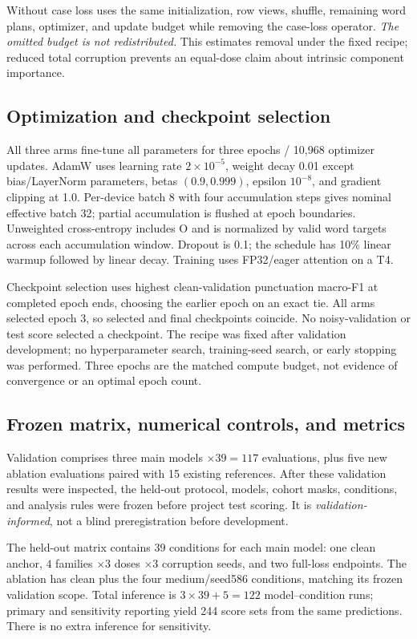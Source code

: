 \documentclass{article}
\begin{document}
Without case loss uses the same initialization, row views, shuffle, remaining
word plans, optimizer, and update budget while removing the case-loss operator.
\emph{The omitted budget is not redistributed.} This estimates removal under
the fixed recipe; reduced total corruption prevents an equal-dose claim about
intrinsic component importance.

\subsection{Optimization and checkpoint selection}
All three arms fine-tune all parameters for three epochs / 10,968 optimizer
updates. AdamW uses learning rate $2\times10^{-5}$, weight decay 0.01 except
bias/LayerNorm parameters, betas $(0.9,0.999)$, epsilon $10^{-8}$, and gradient
clipping at 1.0. Per-device batch 8 with four accumulation steps gives nominal
effective batch 32; partial accumulation is flushed at epoch boundaries.
Unweighted cross-entropy includes O and is normalized by valid word targets
across each accumulation window. Dropout is 0.1; the schedule has 10\% linear
warmup followed by linear decay. Training uses FP32/eager attention on a T4.

Checkpoint selection uses highest clean-validation punctuation macro-F1 at
completed epoch ends, choosing the earlier epoch on an exact tie. All arms
selected epoch 3, so selected and final checkpoints coincide. No noisy-validation
or test score selected a checkpoint. The recipe was fixed after validation
development; no hyperparameter search, training-seed search, or early stopping
was performed. Three epochs are the matched compute budget, not evidence of
convergence or an optimal epoch count.

\subsection{Frozen matrix, numerical controls, and metrics}
Validation comprises three main models $\times39=117$ evaluations, plus five
new ablation evaluations paired with 15 existing references. After these
validation results were inspected, the held-out protocol, models, cohort masks,
conditions, and analysis rules were frozen before project test scoring. It is
\emph{validation-informed}, not a blind preregistration before development.

The held-out matrix contains 39 conditions for each main model: one clean
anchor, $4$ families $\times3$ doses $\times3$ corruption seeds, and two full-loss
endpoints. The ablation has clean plus the four medium/seed586 conditions,
matching its frozen validation scope. Total inference is $3\times39+5=122$
model--condition runs; primary and sensitivity reporting yield 244 score sets
from the same predictions. There is no extra inference for sensitivity.
\end{document}
